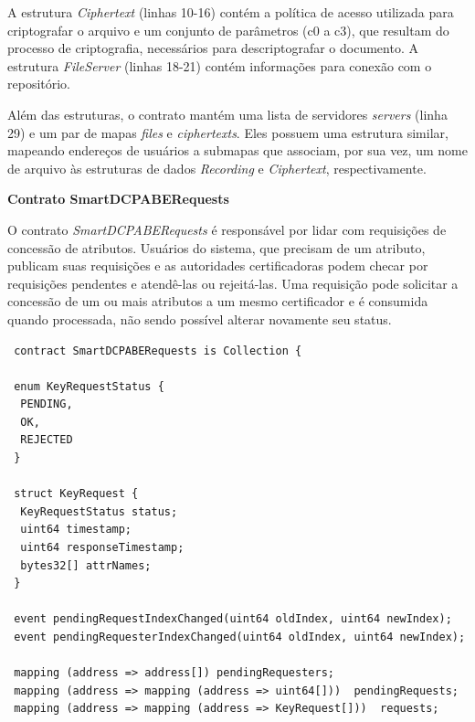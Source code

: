 \documentclass[a4paper,11pt]{article}
\begin{document}
A estrutura \emph{Ciphertext} (linhas 10-16) contém a política de acesso utilizada para criptografar o arquivo e um conjunto de parâmetros (c0 a c3), que resultam do processo de criptografia, necessários para descriptografar o documento.
A estrutura \emph{FileServer} (linhas 18-21) contém informações para conexão com o repositório.

Além das estruturas, o contrato mantém uma lista de servidores \emph{servers} (linha 29) e um par de mapas \emph{files} e \emph{ciphertexts}. Eles possuem uma estrutura similar, mapeando endereços de usuários a submapas que associam, por sua vez, um nome de arquivo às estruturas de dados \emph{Recording} e \emph{Ciphertext}, respectivamente. %

\textbf{Contrato SmartDCPABERequests}



O contrato \emph{SmartDCPABERequests}  é responsável por lidar com requisições de concessão de atributos.
Usuários do sistema, que precisam de um atributo, publicam suas requisições e as autoridades certificadoras podem checar por requisições pendentes e atendê-las ou rejeitá-las.
Uma requisição pode solicitar a concessão de um ou mais atributos a um mesmo certificador e é consumida quando processada, não sendo possível alterar novamente seu status.


\begin{lstlisting}
 contract SmartDCPABERequests is Collection {

 enum KeyRequestStatus {
  PENDING,
  OK,
  REJECTED
 }

 struct KeyRequest {
  KeyRequestStatus status;
  uint64 timestamp;
  uint64 responseTimestamp;
  bytes32[] attrNames;
 }

 event pendingRequestIndexChanged(uint64 oldIndex, uint64 newIndex);
 event pendingRequesterIndexChanged(uint64 oldIndex, uint64 newIndex);

 mapping (address => address[]) pendingRequesters;
 mapping (address => mapping (address => uint64[]))  pendingRequests;
 mapping (address => mapping (address => KeyRequest[]))  requests;
\end{lstlisting}
\end{document}
